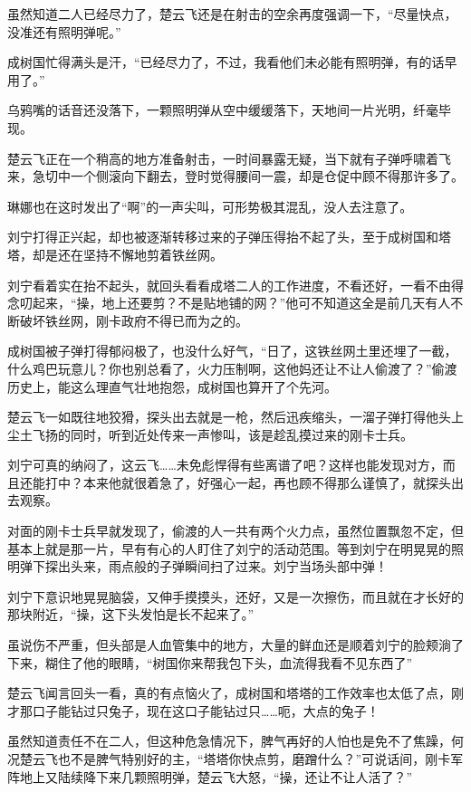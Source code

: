 虽然知道二人已经尽力了，楚云飞还是在射击的空余再度强调一下，“尽量快点，没准还有照明弹呢。”

成树国忙得满头是汗，“已经尽力了，不过，我看他们未必能有照明弹，有的话早用了。”

乌鸦嘴的话音还没落下，一颗照明弹从空中缓缓落下，天地间一片光明，纤毫毕现。

楚云飞正在一个稍高的地方准备射击，一时间暴露无疑，当下就有子弹呼啸着飞来，急切中一个侧滚向下翻去，登时觉得腰间一震，却是仓促中顾不得那许多了。

琳娜也在这时发出了“啊”的一声尖叫，可形势极其混乱，没人去注意了。

刘宁打得正兴起，却也被逐渐转移过来的子弹压得抬不起了头，至于成树国和塔塔，却是还在坚持不懈地剪着铁丝网。

刘宁看着实在抬不起头，就回头看看成塔二人的工作进度，不看还好，一看不由得念叨起来，“操，地上还要剪？不是贴地铺的网？”他可不知道这全是前几天有人不断破坏铁丝网，刚卡政府不得已而为之的。

成树国被子弹打得郁闷极了，也没什么好气，“日了，这铁丝网土里还埋了一截，什么鸡巴玩意儿？你也别总看了，火力压制啊，这他妈还让不让人偷渡了？”偷渡历史上，能这么理直气壮地抱怨，成树国也算开了个先河。

楚云飞一如既往地狡猾，探头出去就是一枪，然后迅疾缩头，一溜子弹打得他头上尘土飞扬的同时，听到近处传来一声惨叫，该是趁乱摸过来的刚卡士兵。

刘宁可真的纳闷了，这云飞……未免彪悍得有些离谱了吧？这样也能发现对方，而且还能打中？本来他就很着急了，好强心一起，再也顾不得那么谨慎了，就探头出去观察。

对面的刚卡士兵早就发现了，偷渡的人一共有两个火力点，虽然位置飘忽不定，但基本上就是那一片，早有有心的人盯住了刘宁的活动范围。等到刘宁在明晃晃的照明弹下探出头来，雨点般的子弹瞬间扫了过来。刘宁当场头部中弹！

刘宁下意识地晃晃脑袋，又伸手摸摸头，还好，又是一次擦伤，而且就在才长好的那块附近，“操，这下头发怕是长不起来了。”

虽说伤不严重，但头部是人血管集中的地方，大量的鲜血还是顺着刘宁的脸颊淌了下来，糊住了他的眼睛，“树国你来帮我包下头，血流得我看不见东西了”

楚云飞闻言回头一看，真的有点恼火了，成树国和塔塔的工作效率也太低了点，刚才那口子能钻过只兔子，现在这口子能钻过只……呃，大点的兔子！

虽然知道责任不在二人，但这种危急情况下，脾气再好的人怕也是免不了焦躁，何况楚云飞也不是脾气特别好的主，“塔塔你快点剪，磨蹭什么？”可说话间，刚卡军阵地上又陆续降下来几颗照明弹，楚云飞大怒，“操，还让不让人活了？”

